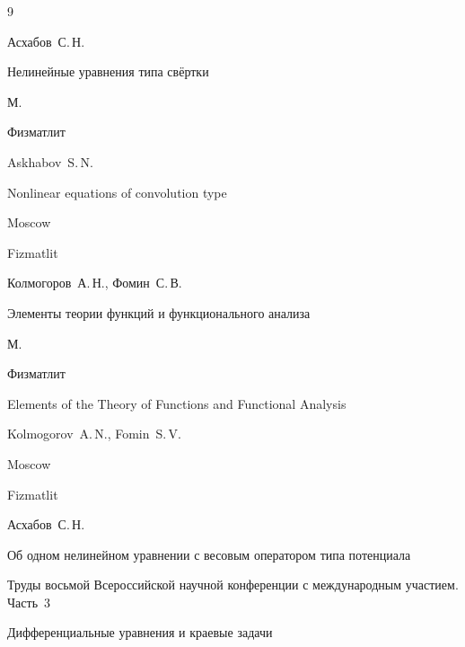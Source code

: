 \begin{thebibliography}{9}




\by Асхабов~С.\,Н. 

\book Нелинейные уравнения типа свёртки 

\publaddr М. 

\publ Физматлит 



\misctransl

\by Askhabov~S.\,N.

\book Nonlinear equations of convolution type

\publaddr Moscow

\publ Fizmatlit












\by Колмогоров~А.\,Н., Фомин~С.\,В. 

\book Элементы теории функций и функционального анализа 

\publaddr М.

\publ Физматлит 



\misctransl

\book Elements of the Theory of Functions and Functional Analysis 

\by Kolmogorov~A.\,N.,  Fomin~S.\,V.

\publaddr Moscow

\publ Fizmatlit






\by Асхабов~С.\,Н.

\paper Об одном нелинейном уравнении с весовым оператором типа потенциала

\inbook Труды восьмой Всероссийской научной конференции с международным участием. \rm Часть~3

\bookinfo Дифференциальные уравнения и краевые задачи


\end{thebibliography}
